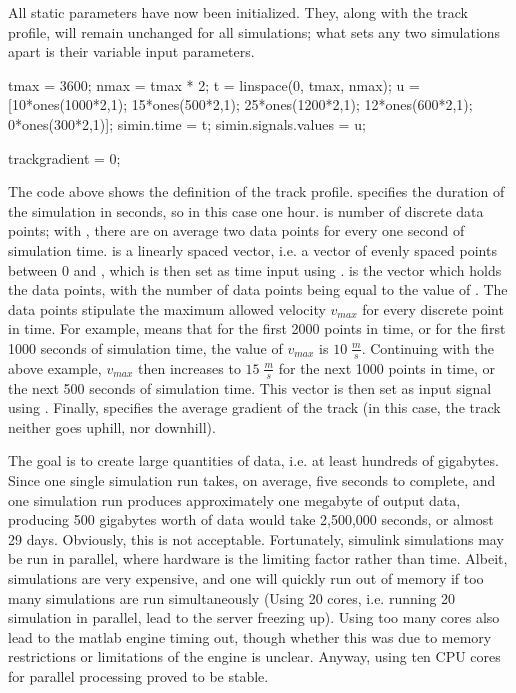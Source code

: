 \noindent
\TODO{}
\par\noindent
All static parameters have now been initialized. They, along with the track profile, will remain unchanged for all simulations; what sets any two simulations apart is their variable input parameters.

\bigskip
\begin{python}
tmax = 3600;
nmax = tmax * 2;
t = linspace(0, tmax, nmax);
u = [10*ones(1000*2,1); 15*ones(500*2,1); 25*ones(1200*2,1); 12*ones(600*2,1); 0*ones(300*2,1)];
simin.time = t;
simin.signals.values = u;

trackgradient = 0;
\end{python}
\bigskip

\noindent
The code above shows the definition of the track profile.  specifies the duration of the simulation in seconds, so in this case one hour.  is number of discrete data points; with , there are on average two data points for every one second of simulation time.  is a linearly spaced vector, i.e. a vector of  evenly spaced points between 0 and , which is then set as time input using .  is the vector which holds the data points, with the number of data points being equal to the value of . The data points stipulate the maximum allowed velocity $v_{max}$ for every discrete point in time. For example,  means that for the first 2000 points in time, or for the first 1000 seconds of simulation time, the value of $v_{max}$ is $10 \; \frac{m}{s}$. Continuing with the above example, $v_{max}$ then increases to $15 \; \frac{m}{s}$ for the next 1000 points in time, or the next 500 seconds of simulation time. This vector  is then set as input signal using . Finally,  specifies the average gradient of the track (in this case, the track neither goes uphill, nor downhill).
\par
The goal is to create large quantities of data, i.e. at least hundreds of gigabytes. Since one single simulation run takes, on average, five seconds to complete, and one simulation run produces approximately one megabyte of output data, producing 500 gigabytes worth of data would take 2,500,000 seconds, or almost 29 days. Obviously, this is not acceptable. Fortunately, simulink simulations may be run in parallel, where hardware is the limiting factor rather than time. Albeit, simulations are very expensive, and one will quickly run out of memory if too many simulations are run simultaneously (Using 20 cores, i.e. running 20 simulation in parallel, lead to the server freezing up). Using too many cores also lead to the matlab engine timing out, though whether this was due to memory restrictions or limitations of the engine is unclear. Anyway, using ten CPU cores for parallel processing proved to be stable.

